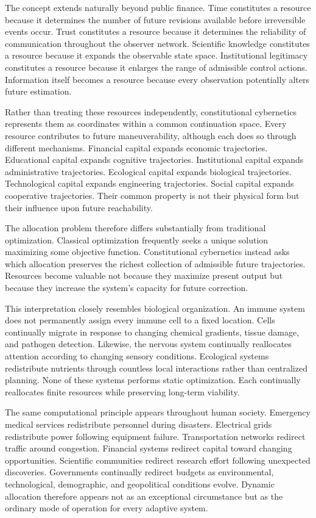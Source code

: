 \documentclass[12pt,a4paper]{article}
\begin{document}
The concept extends naturally beyond public finance. Time constitutes a resource because it determines the number of future revisions available before irreversible events occur. Trust constitutes a resource because it determines the reliability of communication throughout the observer network. Scientific knowledge constitutes a resource because it expands the observable state space. Institutional legitimacy constitutes a resource because it enlarges the range of admissible control actions. Information itself becomes a resource because every observation potentially alters future estimation.

Rather than treating these resources independently, constitutional cybernetics represents them as coordinates within a common continuation space. Every resource contributes to future maneuverability, although each does so through different mechanisms. Financial capital expands economic trajectories. Educational capital expands cognitive trajectories. Institutional capital expands administrative trajectories. Ecological capital expands biological trajectories. Technological capital expands engineering trajectories. Social capital expands cooperative trajectories. Their common property is not their physical form but their influence upon future reachability.

The allocation problem therefore differs substantially from traditional optimization. Classical optimization frequently seeks a unique solution maximizing some objective function. Constitutional cybernetics instead asks which allocation preserves the richest collection of admissible future trajectories. Resources become valuable not because they maximize present output but because they increase the system's capacity for future correction.

This interpretation closely resembles biological organization. An immune system does not permanently assign every immune cell to a fixed location. Cells continually migrate in response to changing chemical gradients, tissue damage, and pathogen detection. Likewise, the nervous system continually reallocates attention according to changing sensory conditions. Ecological systems redistribute nutrients through countless local interactions rather than centralized planning. None of these systems performs static optimization. Each continually reallocates finite resources while preserving long-term viability.

The same computational principle appears throughout human society. Emergency medical services redistribute personnel during disasters. Electrical grids redistribute power following equipment failure. Transportation networks redirect traffic around congestion. Financial systems redirect capital toward changing opportunities. Scientific communities redirect research effort following unexpected discoveries. Governments continually redirect budgets as environmental, technological, demographic, and geopolitical conditions evolve. Dynamic allocation therefore appears not as an exceptional circumstance but as the ordinary mode of operation for every adaptive system.
\end{document}
